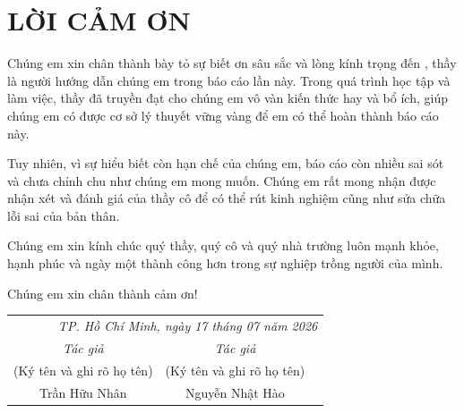\section*{LỜI CẢM ƠN}
	Chúng em xin chân thành bày tỏ sự biết ơn sâu sắc và lòng kính trọng đến \gvhd \mbox{}, thầy là người hướng dẫn chúng em trong báo cáo lần này. Trong quá trình học tập và làm việc, thầy đã truyền đạt cho chúng em vô vàn kiến thức hay và bổ ích, giúp chúng em có được cơ sở lý thuyết vững vàng để em có thể hoàn thành báo cáo này.

	Tuy nhiên, vì sự hiểu biết còn hạn chế của chúng em, báo cáo còn nhiều sai sót và chưa chỉnh chu như chúng em mong muốn. Chúng em rất mong nhận được nhận xét và đánh giá của thầy cô để có thể rút kinh nghiệm cũng như sửa chữa lỗi sai của bản thân.

    Chúng em xin kính chúc quý thầy, quý cô và quý nhà trường luôn mạnh khỏe, hạnh phúc và ngày một thành công hơn trong sự nghiệp trồng người của mình. 
    
    Chúng em xin chân thành cảm ơn!

\begin{flushright}
\begin{tabular}{ccc}
    \multicolumn{3}{r}{\textit{TP. Hồ Chí Minh, ngày 17 tháng 07 năm 2026}} \\
    \noalign{\vspace{0.5cm}} %
    \textit{Tác giả} & \textit{Tác giả} \\
    (Ký tên và ghi rõ họ tên) & (Ký tên và ghi rõ họ tên) \\
    \noalign{\vspace{2cm}}
    Trần Hữu Nhân & Nguyễn Nhật Hào \\
\end{tabular}
\end{flushright}

\newpage
